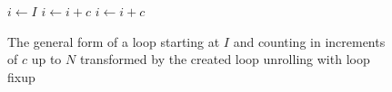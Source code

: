 \begin{figure}[H]
    \centering
    \begin{algorithmic}
        \State $i \gets I$
                \State {} 
                \State $i \gets i + c$ 
            \EndWhile
        \EndIf
            \State {}
            \State $i \gets i + c$
        \EndWhile
        \EndFunction
    \end{algorithmic}
    \caption{The general form of a loop starting at $I$ and counting in increments of $c$ up to $N$ transformed by the created loop unrolling with loop fixup}
    \label{fig:impl:fixup:loop:general-loop}
\end{figure}